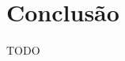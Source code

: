 \documentclass[12pt]{article}
\newcommand{\FC} {Freechains\xspace}
\begin{document}
\section{Conclusão}
\label{sec.conclusion}

TODO

\end{document}
